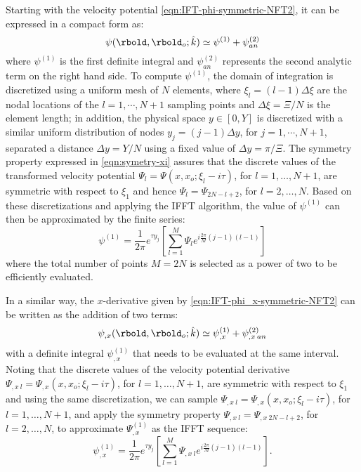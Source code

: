 Starting with the velocity potential \eqref{eqn:IFT-phi-symmetric-NFT2}, it can be expressed in a compact form as:
\begin{equation}
\psi(\rbold,\rbold_{o}; \hat{k}) \simeq \psi^{(1)} + \psi^{(2)}_{an}
\end{equation}
where $\psi^{(1)}$ is the first definite integral and $\psi^{(2)}_{an}$ represents the second analytic term on the right hand side. To compute $\psi^{(1)}$, the domain of integration is discretized using a uniform mesh of $N$ elements, where $ \xi_{l}= (l-1) \Delta \xi$ are the nodal locations of the $l=1,\cdots,N+1$ sampling points and $\Delta\xi=\Xi/N$ is the element length; in addition, the physical space $y \in [0,Y]$ is discretized with a similar uniform distribution of nodes $y_{j}=(j-1)\Delta y$, for $j=1,\cdots,N+1$, separated a distance $\Delta y=Y/N$ using a fixed value of $\Delta y = \pi/\Xi$. The symmetry property expressed in \eqref{eqn:symetry-xi} assures that the discrete values of the transformed velocity potential $\varPsi_{l}=\varPsi(x,x_o; \xi_{l}-i\tau)$, for $l=1,\ldots,N+1$, are symmetric with respect to $\xi_{1}$ and hence $\varPsi_{l}=\varPsi_{2N-l+2}$, for $l=2,\ldots,N$. Based on these discretizations and applying the IFFT algorithm, the value of $\psi^{(1)}$ can then be approximated by the finite series:
%
\begin{equation}
\psi^{(1)}=\dfrac{1}{2\pi} e^{\tau y_{j}} \left[ \sum_{l=1}^{M} \varPsi_{l} e^{i\frac{2\pi}{M}(j-1)(l-1)}
\right]
\end{equation}
%
where the total number of points $M=2N$ is selected as a power of two to be efficiently evaluated.

In a similar way, the $x$-derivative given by \eqref{eqn:IFT-phi_x-symmetric-NFT2} can be written as the addition of two terms:
%
\begin{equation}
\psi_{,x}(\rbold,\rbold_{o}; \hat{k}) \simeq \psi^{(1)}_{,x} + \psi^{(2)}_{,x \: an}
\end{equation}
%
with a definite integral $\psi^{(1)}_{,x}$ that needs to be evaluated at the same interval. Noting that the discrete values of the velocity potential derivative $\varPsi_{,x \: l}=\varPsi_{,x}(x,x_o; \xi_{l}-i\tau)$, for $l=1,\ldots,N+1$, are symmetric with respect to $\xi_{1}$ and using the same discretization, we can sample $\varPsi_{,x \: l}=\varPsi_{,x}(x,x_o; \xi_{l}-i\tau)$, for $l=1,\ldots,N+1$, and apply the symmetry property $\varPsi_{,x \: l}=\varPsi_{,x \: 2N-l+2}$, for $ l=2,\ldots,N$, to approximate $\varPsi_{,x}^{(1)}$ as the IFFT sequence:
%
\begin{equation}
\psi_{,x}^{(1)}=\dfrac{1}{2\pi} e^{\tau y_{j}} \left[ \sum_{l=1}^{M} \varPsi_{,x \: l} e^{i\frac{2\pi}{M}(j-1)(l-1)}
\right].
\end{equation}

